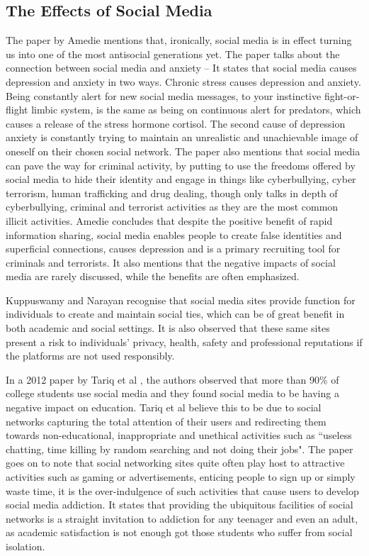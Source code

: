 \documentclass[lettersize,journal]{IEEEtran}
\begin{document}
\subsection{The Effects of Social Media}
    The paper by Amedie \cite{Amedie 2015} mentions that, ironically, social
    media is in effect turning us into one of the most antisocial generations
    yet. The paper talks about the connection between social media and anxiety
    – It states that social media causes depression and anxiety in two ways. Chronic
    stress causes depression and anxiety. Being constantly alert for new social
    media messages, to your instinctive fight-or-flight limbic system, is the 
    same as being on continuous alert for predators, which causes a release of
    the stress hormone cortisol. The second cause of depression anxiety is
    constantly trying to maintain an unrealistic and unachievable image of
    oneself on their chosen social network. The paper also mentions
    that social media can pave the way for criminal activity, by putting to use
    the freedoms offered by social media to hide their identity and engage in
    things like cyberbullying, cyber terrorism, human trafficking and drug dealing,
    though only talks in depth of cyberbullying, criminal and terrorist activities
    as they are the most common illicit activities. Amedie concludes that despite
    the positive benefit of rapid information sharing, social media enables people
    to create false identities and superficial connections, causes depression and
    is a primary recruiting tool for criminals and terrorists. It also mentions
    that the negative impacts of social media are rarely discussed, while the benefits
    are often emphasized.

    Kuppuswamy and Narayan \cite{Kuppuswamy et al 2010} recognise that social
    media sites provide function for individuals to create and maintain social
    ties, which can be of great benefit in both academic and social settings.
    It is also observed that these same sites present a risk to individuals'
    privacy, health, safety and professional reputations if the platforms are
    not used responsibly.

    In a 2012 paper by Tariq et al \cite{Tariq et al 2012}, the authors observed that more than 90\%
    of college students use social media \cite{Ellison et al 2007} and they found social media to be
    having a negative impact on education. Tariq et al believe this to be due to social networks
    capturing the total attention of their users and redirecting them towards non-educational, inappropriate
    and unethical activities such as ``useless chatting, time killing by random searching and not doing their jobs". The paper
    goes on to note that social networking sites quite often play host to attractive activities such
    as gaming or advertisements, enticing people to sign up or simply waste time, it is the over-indulgence
    of such activities that cause users to develop social media addiction. It states that providing the ubiquitous
    facilities of social networks is a straight invitation to addiction for any teenager and even an adult, as
    academic satisfaction is not enough got those students who suffer from social isolation\cite{Pempek et al 2009}. 
\end{document}
